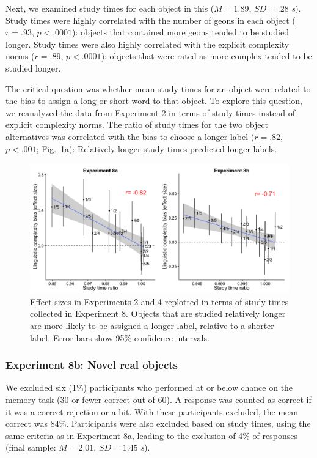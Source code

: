 \documentclass[man]{apa2}
\begin{document}
Next, we examined study times for each object in this ($M = 1.89$, $SD = .28$ {\it s}). Study times were highly correlated with the number of geons in each object ($r=.93$, $p<.0001$): objects that contained more geons tended to be studied longer. Study times were also highly correlated with the explicit complexity norms ($r = .89$, $p < .0001$): objects that were rated as more complex tended to be studied longer.

The critical question was whether mean study times for an object were related to the bias to assign a long or short word to that object. To explore this question, we reanalyzed the data from Experiment 2 in terms of study times instead of explicit complexity norms. The ratio of study times for the two object alternatives was correlated with the bias to choose a longer label ($r = .82$, $p < .001$; Fig.\ \ref{fig:study3_plots}a): Relatively longer study times predicted longer labels.

 \begin{figure}
 \begin{center}
  \includegraphics[width=6in]{figures/study3_plots.png}
  \caption{\label{fig:study3_plots} Effect sizes in Experiments 2 and 4 replotted in terms of study times collected in Experiment 8. Objects that are studied relatively longer are more likely to be assigned a longer label, relative to a shorter label. Error bars show 95\% confidence intervals.}
 \end{center}
\end{figure}

\subsubsection{Experiment 8b: Novel real objects}
We excluded six (1\%) participants who performed at or below chance on the memory task (30 or fewer correct out of 60). A response was counted as correct if it was a correct rejection or a hit. With these participants excluded, the mean correct was 84\%. Participants were also excluded based on study times, using the same criteria as in Experiment 8a, leading to the exclusion of 4\% of responses (final sample: $M = 2.01$, $SD = 1.45$ {\it s}).
\end{document}
